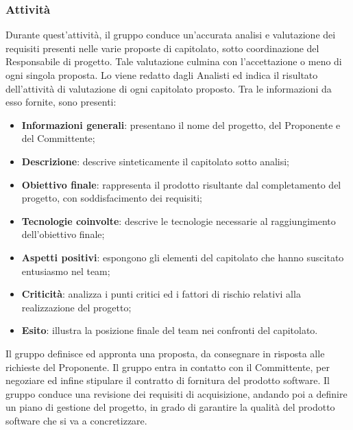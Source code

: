     \subsubsection{Attività}
    Durante quest'attività, il gruppo conduce un'accurata analisi e valutazione dei requisiti presenti nelle varie proposte di capitolato, sotto coordinazione del Responsabile di progetto. Tale valutazione culmina con l'accettazione o meno di ogni singola proposta.
    Lo \SdF{} viene redatto dagli Analisti ed indica il risultato dell'attività di valutazione di ogni capitolato proposto. Tra le informazioni da esso fornite, sono presenti:
    \begin{itemize}
        \item{\textbf{Informazioni generali}: presentano il nome del progetto, del Proponente e del Committente;}
        \item{\textbf{Descrizione}: descrive sinteticamente il capitolato sotto analisi;}
        \item{\textbf{Obiettivo finale}: rappresenta il prodotto risultante dal completamento del progetto, con soddisfacimento dei requisiti;}
        \item{\textbf{Tecnologie coinvolte}: descrive le tecnologie necessarie al raggiungimento dell'obiettivo finale;}
        \item{\textbf{Aspetti positivi}: espongono gli elementi del capitolato che hanno suscitato entusiasmo nel team;}
        \item{\textbf{Criticità}: analizza i punti critici ed i fattori di rischio relativi alla realizzazione del progetto;}
        \item{\textbf{Esito}: illustra la posizione finale del team nei confronti del capitolato.}
    \end{itemize}
    Il gruppo definisce ed appronta una proposta, da consegnare in risposta alle richieste del Proponente.
    Il gruppo entra in contatto con il Committente, per negoziare ed infine stipulare il contratto di fornitura del prodotto software.
    Il gruppo conduce una revisione dei requisiti di acquisizione, andando poi a definire un piano di gestione del progetto, in grado di garantire la qualità del prodotto software che si va a concretizzare.
